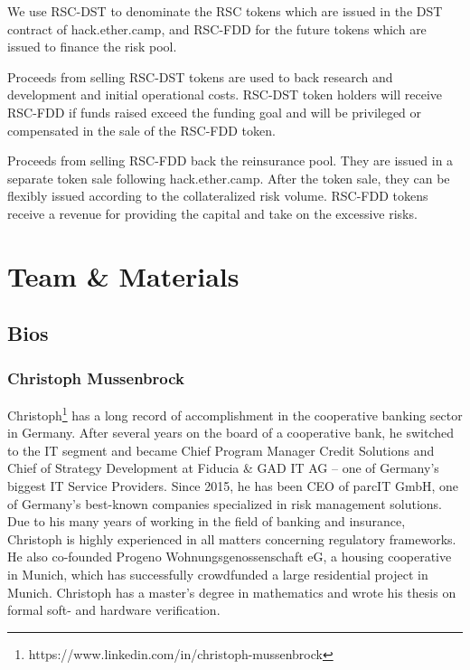 \documentclass[12pt]{article}
\begin{document}
We use RSC-DST to denominate the RSC tokens which are issued in the DST contract of hack.ether.camp, and RSC-FDD for the future tokens which are issued to finance the risk pool. 

Proceeds from selling RSC-DST tokens are used to back research and development and initial operational costs. RSC-DST token holders will receive RSC-FDD if funds raised exceed the funding goal and will be privileged or compensated in the sale of the RSC-FDD token.


Proceeds from selling RSC-FDD back the reinsurance pool. They are issued in a separate token sale following hack.ether.camp. After the token sale, they can be flexibly issued according to the collateralized risk volume. RSC-FDD tokens receive a revenue for providing the capital and take on the excessive risks.


\section{Team \& Materials}

\subsection{Bios}

\subsubsection{Christoph Mussenbrock}

Christoph\footnote{https://www.linkedin.com/in/christoph-mussenbrock} has a long record of accomplishment in the cooperative banking sector in Germany. After several years on the board of a cooperative bank, he switched to the IT segment and became Chief Program Manager Credit Solutions and Chief of Strategy Development at Fiducia & GAD IT AG – one of Germany’s biggest IT Service Providers. Since 2015, he has been CEO of parcIT GmbH, one of Germany’s best-known companies specialized in risk management solutions. Due to his many years of working in the field of banking and insurance, Christoph is highly experienced in all matters concerning regulatory frameworks. He also co-founded Progeno Wohnungsgenossenschaft eG, a housing cooperative in Munich, which has successfully crowdfunded a large residential project in Munich. Christoph has a master’s degree in mathematics and wrote his thesis on formal soft- and hardware verification.
\end{document}
